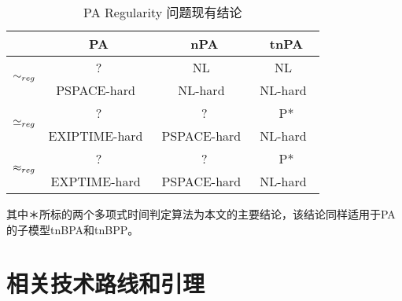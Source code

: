 \begin{table}[htbp]
\begin{center}
\begin{tabular}{|c|c|c|c|}
\hline
	&PA	&nPA	&tnPA\\
\hline
\hline
\multirow{2}{*}{$\sim_{reg}$} &
 ? &NL~\cite{Kucera1996} &NL~\cite{Kucera1996} \\
& PSPACE-hard~\cite{Srba2002a} & NL-hard~\cite{Srba2002a} & NL-hard~\cite{Srba2002a}\\
\hline
\multirow{2}{*}{$\simeq_{reg}$} &
 ? & ? &P* \\
& EXIPTIME-hard~\cite{Mayr2003} & PSPACE-hard~\cite{Srba2003} & NL-hard~\cite{Srba2002a}\\
\hline
\multirow{2}{*}{$\approx_{reg}$} &
 ? & ? &P* \\
& EXPTIME-hard~\cite{Mayr2003} & PSPACE-hard~\cite{Srba2003} & NL-hard~\cite{Srba2002a}\\
\hline
\end{tabular}
\caption{\textsf{PA} Regularity 问题现有结论}
\label{tab:pa-reg}
\end{center}
\end{table}

其中＊所标的两个多项式时间判定算法为本文的主要结论，该结论同样适用于PA的子模型tnBPA和tnBPP。
\section{相关技术路线和引理}
\label{sec:lemma}

